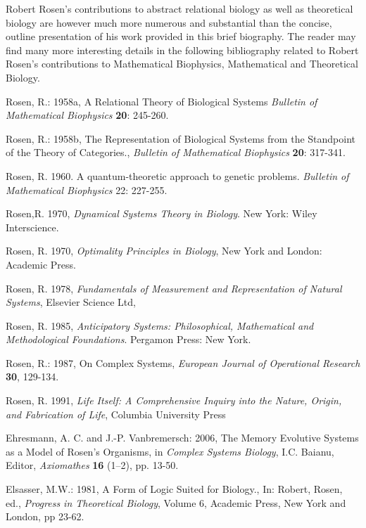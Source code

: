 \documentclass[12pt]{article}
\theoremstyle{plain}
\theoremstyle{definition}
\numberwithin{equation}{section}
\begin{document}
 Robert Rosen's contributions to abstract relational biology as well as theoretical biology are however much more numerous and substantial than the concise, outline presentation of his work provided in this brief biography. 
The reader may find many more interesting details in the following bibliography related to Robert Rosen's contributions
to Mathematical Biophysics, Mathematical and Theoretical Biology. 

\begin{thebibliography}{99}

Rosen, R.: 1958a, A Relational Theory of Biological Systems \emph{Bulletin of Mathematical Biophysics} 
\textbf{20}: 245-260.

Rosen, R.: 1958b, The Representation of Biological Systems from the Standpoint of the 
Theory of Categories., \emph{ Bulletin of Mathematical Biophysics} \textbf{20}: 317-341.

Rosen, R. 1960. A quantum-theoretic approach to genetic problems. \emph{Bulletin of Mathematical Biophysics} 
22: 227-255.

Rosen,R. 1970, \emph{Dynamical Systems Theory in Biology}. New York: Wiley Interscience. 

Rosen, R. 1970, \emph{Optimality Principles in Biology}, New York and London: Academic Press. 

Rosen, R. 1978, \emph{Fundamentals of Measurement and Representation of Natural Systems}, Elsevier Science Ltd, 

Rosen, R. 1985, \emph{Anticipatory Systems: Philosophical, Mathematical and Methodological Foundations}. Pergamon Press:
New York. 

Rosen, R.: 1987, On Complex Systems, \emph{European Journal of Operational Research} 
\textbf{30}, 129-134.

Rosen, R. 1991, \emph{Life Itself: A Comprehensive Inquiry into the Nature, Origin, and Fabrication of Life}, Columbia University Press 

Ehresmann, A. C. and J.-P. Vanbremersch: 2006, The Memory Evolutive Systems as a Model of Rosen's Organisms, 
in \emph{Complex Systems Biology}, I.C. Baianu, Editor, \emph{Axiomathes} \textbf{16} (1--2), pp. 13-50.

Elsasser, M.W.: 1981, A Form of Logic Suited for Biology., In: Robert, Rosen, ed., \emph{Progress in Theoretical Biology},  Volume 6, Academic Press, New York and London, pp 23-62.


\end{thebibliography}
\end{document}
